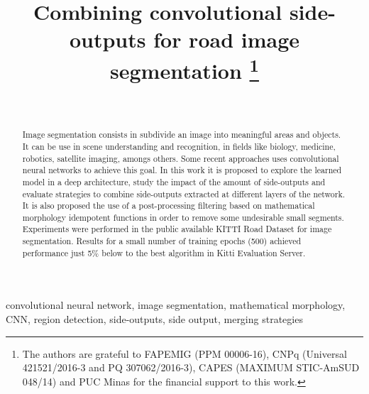 \documentclass[conference]{IEEEtran}
\begin{document}
\title{Combining convolutional side-outputs for road image segmentation
\thanks{The authors are grateful to FAPEMIG (PPM 00006-16), CNPq (Universal 421521/2016-3 and PQ 307062/2016-3), CAPES (MAXIMUM STIC-AmSUD 048/14) and PUC Minas for the financial support to this work.}
}

\author{
\\
}

\maketitle

\begin{abstract}
Image segmentation consists in subdivide an image into meaningful areas and objects. It can be use in scene understanding and recognition, in fields like biology, medicine, robotics, satellite imaging, amongs others. Some recent approaches uses convolutional neural networks to achieve this goal. In this work it is proposed to explore the learned model in a deep architecture, study the impact of the amount of side-outputs and evaluate strategies to combine side-outputs extracted at different layers of the network. It is also proposed the use of a post-processing filtering based on mathematical morphology idempotent functions in order to remove some undesirable small segments. Experiments were performed in the public available KITTI Road Dataset for image segmentation. Results for a small number of training epochs (500) achieved performance just 5\% below to the best algorithm in Kitti Evaluation Server.
\end{abstract}


\begin{IEEEkeywords}
convolutional neural network, image segmentation, mathematical morphology, CNN, region detection, side-outputs, side output, merging strategies
\end{IEEEkeywords}


%







\end{document}
